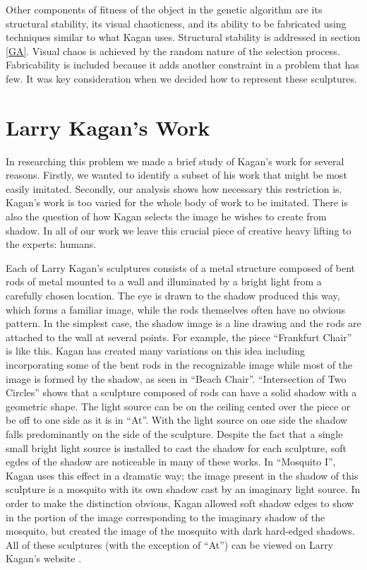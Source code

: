 \documentclass[10pt]{article}
\begin{document}
Other components of fitness of the object in the genetic algorithm
are its structural stability, its visual chaoticness, and its ability
to be fabricated using techniques similar to what Kagan uses. Structural stability
is addressed in section \ref{GA}. Visual
chaos is achieved by the random nature of the selection process.
Fabricability is included because it adds another constraint in a
problem that has few. It was key consideration when we decided
how to represent these sculptures.

\section{Larry Kagan's Work} \label{kagan}
In researching this problem we made a brief study of Kagan's work for
several reasons. Firstly, we wanted to identify a subset of his work
that might be most easily imitated. Secondly, our analysis shows how
necessary this restriction is. Kagan's work is too varied for the
whole body of work to be imitated. There is also the question of how
Kagan selects the image he wishes to create from shadow. In all of our
work we leave this crucial piece of creative heavy lifting to the
experts: humans.

Each of Larry Kagan's sculptures consists of a metal structure
composed of bent rods of metal mounted to a wall and illuminated by
a bright light from a carefully chosen location. The eye is drawn to
the shadow produced this way, which forms a familiar image, while the
rods themselves often have no obvious pattern. In the simplest case,
the shadow image is a line drawing and the rods are attached to the
wall at several points. For example, the piece ``Frankfurt Chair'' is
like this. Kagan has created many variations on this idea including
incorporating some of the bent rods in the recognizable image while
most of the image is formed by the shadow, as seen in ``Beach Chair''.
``Intersection of Two Circles'' shows that a sculpture composed of rods
can have a solid shadow with a geometric shape. The light source can
be on the ceiling cented over the piece or be off to one side as it
is in ``At''. With the light source on one side the shadow falls
predominantly on the side of the sculpture. Despite the fact that a
single small bright light source is installed to cast the shadow for
each sculpture, soft egdes of the shadow are noticeable in many of
these works. In ``Mosquito I'', Kagan uses this effect in a dramatic
way; the image present in the shadow of this sculpture is a mosquito
with its own shadow cast by an imaginary light source. In order to
make the distinction obvious, Kagan allowed soft shadow edges to show
in the portion of the image corresponding to the imaginary shadow of
the mosquito, but created the image of the mosquito with dark
hard-edged shadows. All of these sculptures (with the exception of ``At'') can be viewed on Larry Kagan's website \cite{Kagan}.
\end{document}
